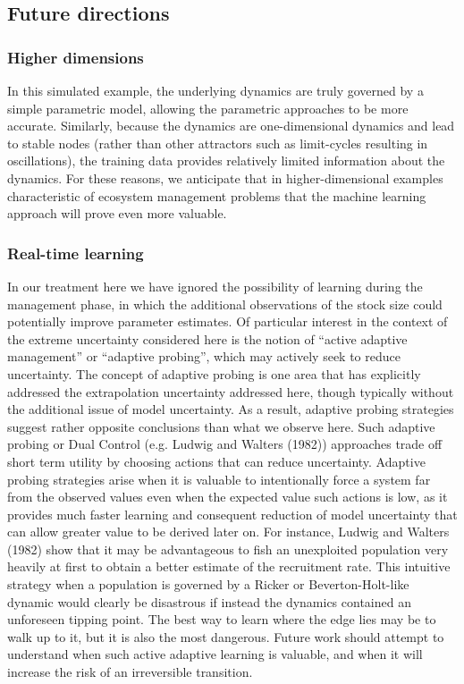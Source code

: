 \documentclass[author-year, review]{elsarticle} %
\begin{document}
\subsection{Future directions}\label{future-directions}

\subsubsection{Higher dimensions}\label{higher-dimensions}

In this simulated example, the underlying dynamics are truly governed by
a simple parametric model, allowing the parametric approaches to be more
accurate. Similarly, because the dynamics are one-dimensional dynamics
and lead to stable nodes (rather than other attractors such as
limit-cycles resulting in oscillations), the training data provides
relatively limited information about the dynamics. For these reasons, we
anticipate that in higher-dimensional examples characteristic of
ecosystem management problems that the machine learning approach will
prove even more valuable.

\subsubsection{Real-time learning}\label{real-time-learning}

In our treatment here we have ignored the possibility of learning during
the management phase, in which the additional observations of the stock
size could potentially improve parameter estimates. Of particular
interest in the context of the extreme uncertainty considered here is
the notion of ``active adaptive management'' or ``adaptive probing'',
which may actively seek to reduce uncertainty. The concept of adaptive
probing is one area that has explicitly addressed the extrapolation
uncertainty addressed here, though typically without the additional
issue of model uncertainty. As a result, adaptive probing strategies
suggest rather opposite conclusions than what we observe here. Such
adaptive probing or Dual Control (e.g. Ludwig and Walters (1982))
approaches trade off short term utility by choosing actions that can
reduce uncertainty. Adaptive probing strategies arise when it is
valuable to intentionally force a system far from the observed values
even when the expected value such actions is low, as it provides much
faster learning and consequent reduction of model uncertainty that can
allow greater value to be derived later on. For instance, Ludwig and
Walters (1982) show that it may be advantageous to fish an unexploited
population very heavily at first to obtain a better estimate of the
recruitment rate. This intuitive strategy when a population is governed
by a Ricker or Beverton-Holt-like dynamic would clearly be disastrous if
instead the dynamics contained an unforeseen tipping point. The best way
to learn where the edge lies may be to walk up to it, but it is also the
most dangerous. Future work should attempt to understand when such
active adaptive learning is valuable, and when it will increase the risk
of an irreversible transition.
\end{document}
